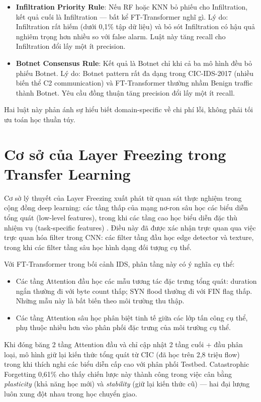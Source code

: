 \documentclass[../DoAn.tex]{subfiles}
\begin{document}
\begin{itemize}
    \item \textbf{Infiltration Priority Rule}: Nếu RF hoặc KNN bỏ phiếu cho Infiltration, kết quả cuối là Infiltration --- bất kể FT-Transformer nghĩ gì. Lý do: Infiltration rất hiếm (dưới 0,1\% tập dữ liệu) và bỏ sót Infiltration có hậu quả nghiêm trọng hơn nhiều so với false alarm. Luật này tăng recall cho Infiltration đổi lấy một ít precision.

    \item \textbf{Botnet Consensus Rule}: Kết quả là Botnet chỉ khi cả ba mô hình đều bỏ phiếu Botnet. Lý do: Botnet pattern rất đa dạng trong CIC-IDS-2017 (nhiều biến thể C2 communication) và FT-Transformer thường nhầm Benign traffic thành Botnet. Yêu cầu đồng thuận tăng precision đổi lấy một ít recall.
\end{itemize}

Hai luật này phản ánh sự hiểu biết domain-specific về chi phí lỗi, không phải tối ưu toán học thuần túy.

\section{Cơ sở của Layer Freezing trong Transfer Learning}
\label{sec:pt-freezing}

Cơ sở lý thuyết của Layer Freezing xuất phát từ quan sát thực nghiệm trong cộng đồng deep learning: các tầng thấp của mạng nơ-ron sâu học các biểu diễn tổng quát (low-level features), trong khi các tầng cao học biểu diễn đặc thù nhiệm vụ (task-specific features) \cite{yosinski2014transferable}. Điều này đã được xác nhận trực quan qua việc trực quan hóa filter trong CNN: các filter tầng đầu học edge detector và texture, trong khi các filter tầng sâu học hình dạng đối tượng cụ thể.

Với FT-Transformer trong bối cảnh IDS, phân tầng này có ý nghĩa cụ thể:
\begin{itemize}
    \item Các tầng Attention đầu học các mẫu tương tác đặc trưng tổng quát: duration ngắn thường đi với byte count thấp; SYN flood thường đi với FIN flag thấp. Những mẫu này là bất biến theo môi trường thu thập.
    \item Các tầng Attention sâu học phân biệt tinh tế giữa các lớp tấn công cụ thể, phụ thuộc nhiều hơn vào phân phối đặc trưng của môi trường cụ thể.
\end{itemize}

Khi đóng băng 2 tầng Attention đầu và chỉ cập nhật 2 tầng cuối + đầu phân loại, mô hình giữ lại kiến thức tổng quát từ CIC (đã học trên 2,8 triệu flow) trong khi thích nghi các biểu diễn cấp cao với phân phối Testbed. Catastrophic Forgetting 0,61\% cho thấy chiến lược này thành công trong việc cân bằng \textit{plasticity} (khả năng học mới) và \textit{stability} (giữ lại kiến thức cũ) --- hai đại lượng luôn xung đột nhau trong học chuyển giao.
\end{document}
